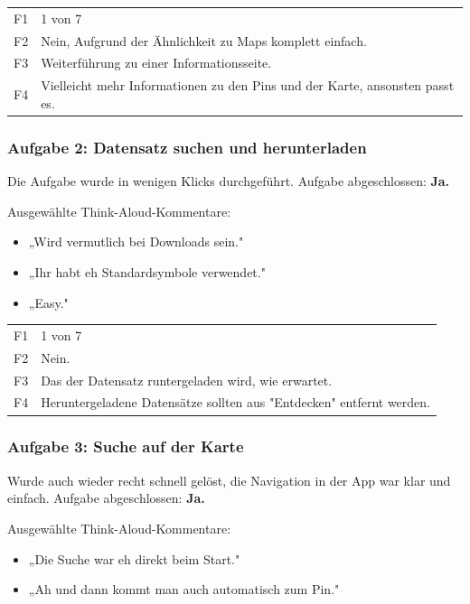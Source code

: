 \documentclass{article}
\begin{document}
\begin{tabular}{@{}lp{10cm}@{}}
  F1 & 1 von 7 \\
  F2 & Nein, Aufgrund der Ähnlichkeit zu Maps komplett einfach. \\
  F3 & Weiterführung zu einer Informationsseite. \\
  F4 & Vielleicht mehr Informationen zu den Pins und der Karte, ansonsten passt es. \\
\end{tabular}

\subsubsection*{Aufgabe 2: Datensatz suchen und herunterladen}
Die Aufgabe wurde in wenigen Klicks durchgeführt. Aufgabe abgeschlossen: \textbf{Ja.}

\bigskip
Ausgewählte Think-Aloud-Kommentare:
\begin{itemize}
  \item „Wird vermutlich bei Downloads sein."
  \item „Ihr habt eh Standardsymbole verwendet."
  \item „Easy."
\end{itemize}

\begin{tabular}{@{}lp{10cm}@{}}
  F1 & 1 von 7 \\
  F2 & Nein. \\
  F3 & Das der Datensatz runtergeladen wird, wie erwartet. \\
  F4 & Heruntergeladene Datensätze sollten aus "Entdecken" entfernt werden. \\
\end{tabular}

\subsubsection*{Aufgabe 3: Suche auf der Karte}

Wurde auch wieder recht schnell gelöst, die Navigation in der App war klar und einfach.
Aufgabe abgeschlossen: \textbf{Ja.}

\bigskip
Ausgewählte Think-Aloud-Kommentare:
\begin{itemize}
  \item „Die Suche war eh direkt beim Start."
  \item „Ah und dann kommt man auch automatisch zum Pin."
\end{itemize}
\end{document}
